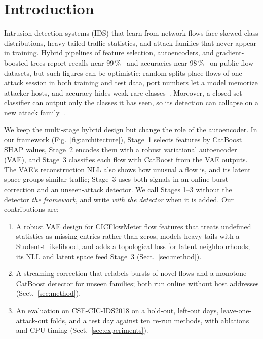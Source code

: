\documentclass[runningheads,a4paper]{llncs}
\begin{document}
\section{Introduction}

Intrusion detection systems (IDS) that learn from network flows face skewed class distributions, heavy-tailed traffic statistics, and attack families that never appear in training. Hybrid pipelines of feature selection, autoencoders, and gradient-boosted trees report recalls near 99\,\%~\cite{kang2022} and accuracies near 98\,\%~\cite{chen2025vae} on public flow datasets, but such figures can be optimistic: random splits place flows of one attack session in both training and test data, port numbers let a model memorize attacker hosts, and accuracy hides weak rare classes~\cite{arp2022,engelen2021,dhooge2022,flood2024}. Moreover, a closed-set classifier can output only the classes it has seen, so its detection can collapse on a new attack family~\cite{ferreira2020,sakr2026}.

We keep the multi-stage hybrid design but change the role of the autoencoder. In our framework (Fig.~\ref{fig:architecture}), Stage~1 selects features by CatBoost SHAP values, Stage~2 encodes them with a robust variational autoencoder (VAE), and Stage~3 classifies each flow with CatBoost from the VAE outputs. The VAE's reconstruction NLL also shows how unusual a flow is, and its latent space groups similar traffic; Stage~3 uses both signals in an online burst correction and an unseen-attack detector. We call Stages 1--3 without the detector \emph{the framework}, and write \emph{with the detector} when it is added. Our contributions are:
\begin{enumerate}
\item A robust VAE design for CICFlowMeter flow features that treats undefined statistics as missing entries rather than zeros, models heavy tails with a Student-t likelihood, and adds a topological loss for latent neighbourhoods; its NLL and latent space feed Stage~3 (Sect.~\ref{sec:method}).
\item A streaming correction that relabels bursts of novel flows and a monotone CatBoost detector for unseen families; both run online without host addresses (Sect.~\ref{sec:method}).
\item An evaluation on CSE-CIC-IDS2018 on a hold-out, left-out days, leave-one-attack-out folds, and a test day against ten re-run methods, with ablations and CPU timing (Sect.~\ref{sec:experiments}).
\end{enumerate}
\end{document}
